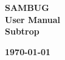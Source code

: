 \documentclass[11pt,a4paper,titlepage]{article}
\begin{document}

\begin{titlepage}
	
	
	\begin{center}
		\vspace*{-3cm}
	\end{center}
	
	
    \vspace*{2cm}
      \Huge \textbf {SAMBUG}\\
      
    \vspace*{-0.5cm}
	  \huge \textbf {User Manual}\\
	  
	\vspace*{-0.5cm}  
      \LARGE \textbf {Subtrop}
         
    \vskip2cm
          
    \large \textbf{\monthyeardate\today}
  
    \vfill
\end{titlepage}
	
	

\tableofcontents
\listoffigures
\end{document}
